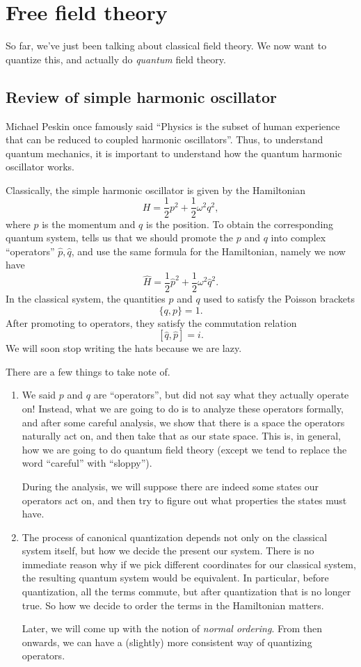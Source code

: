 \documentclass[a4paper]{article}
\begin{document}
\section{Free field theory}
So far, we've just been talking about classical field theory. We now want to quantize this, and actually do \emph{quantum} field theory.
\subsection{Review of simple harmonic oscillator}
Michael Peskin once famously said ``Physics is the subset of human experience that can be reduced to coupled harmonic oscillators''. Thus, to understand quantum mechanics, it is important to understand how the quantum harmonic oscillator works.

Classically, the simple harmonic oscillator is given by the Hamiltonian
\[
  H = \frac{1}{2}p^2 + \frac{1}{2} \omega^2 q^2,
\]
where $p$ is the momentum and $q$ is the position. To obtain the corresponding quantum system,  tells us that we should promote the $p$ and $q$ into complex ``operators'' $\hat{p}, \hat{q}$, and use the same formula for the Hamiltonian, namely we now have
\[
  \hat{H} = \frac{1}{2}\hat{p}^2 + \frac{1}{2} \omega^2 \hat{q}^2.
\]
In the classical system, the quantities $p$ and $q$ used to satisfy the Poisson brackets
\[
  \{q, p\} = 1.
\]
After promoting to operators, they satisfy the commutation relation
\[
  [\hat{q}, \hat{p}] = i.
\]
We will soon stop writing the hats because we are lazy.

There are a few things to take note of.
\begin{enumerate}
  \item We said $p$ and $q$ are ``operators'', but did not say what they actually operate on! Instead, what we are going to do is to analyze these operators formally, and after some careful analysis, we show that there is a space the operators naturally act on, and then take that as our state space. This is, in general, how we are going to do quantum field theory (except we tend to replace the word ``careful'' with ``sloppy'').

    During the analysis, we will suppose there are indeed some states our operators act on, and then try to figure out what properties the states must have.

  \item The process of canonical quantization depends not only on the classical system itself, but how we decide the present our system. There is no immediate reason why if we pick different coordinates for our classical system, the resulting quantum system would be equivalent. In particular, before quantization, all the terms commute, but after quantization that is no longer true. So how we decide to order the terms in the Hamiltonian matters.

    Later, we will come up with the notion of \emph{normal ordering}. From then onwards, we can have a (slightly) more consistent way of quantizing operators.
\end{enumerate}
\end{document}
